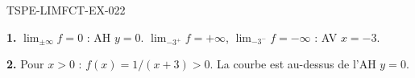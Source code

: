 \begin{corrige}{TSPE-LIMFCT-EX-022}

\textbf{1.} $\lim_{\pm\infty} f = 0$ : AH $y = 0$. $\lim_{-3^+} f = +\infty$, $\lim_{-3^-} f = -\infty$ : AV $x = -3$.

\textbf{2.} Pour $x > 0$ : $f(x) = 1/(x+3) > 0$. La courbe est au-dessus de l'AH $y = 0$.

\end{corrige}
